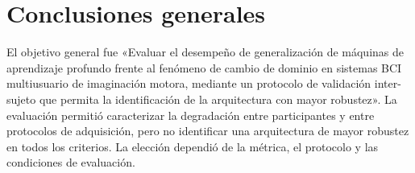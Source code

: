 \chapter{Conclusiones generales}
\label{cap:conclusiones}

El objetivo general fue «Evaluar el desempeño de generalización de máquinas de aprendizaje profundo
frente al fenómeno de cambio de dominio en sistemas BCI multiusuario de
imaginación motora, mediante un protocolo de validación inter-sujeto que
permita la identificación de la arquitectura con mayor robustez». La evaluación permitió
caracterizar la degradación entre participantes y entre protocolos de adquisición, pero no identificar
una arquitectura de mayor robustez en todos los criterios. La elección dependió de la métrica,
el protocolo y las condiciones de evaluación.

